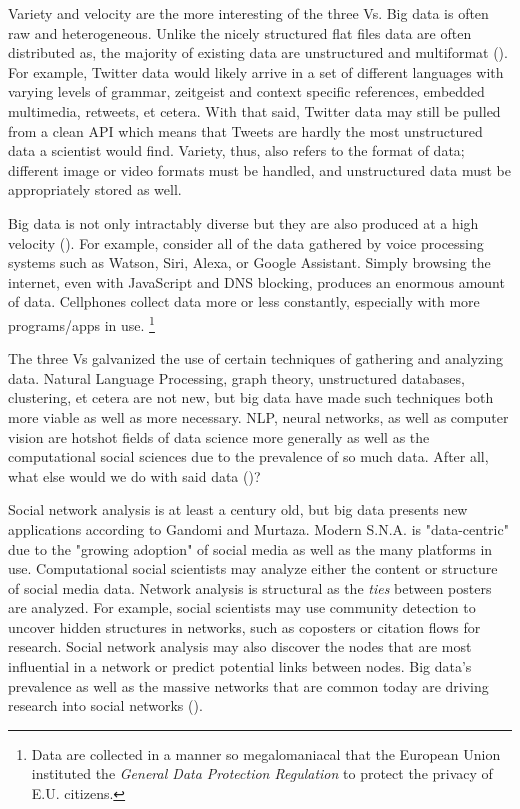 \documentclass[12pt, a4paper]{article}
\begin{document}
Variety and velocity are the more interesting of the three Vs. Big data is often raw and heterogeneous. Unlike the nicely structured flat files data are often distributed as, the majority of existing data are unstructured and multiformat (\cite{gandomiamir2015}). For example, Twitter data would likely arrive in a set of different languages with varying levels of grammar, zeitgeist and context specific references, embedded multimedia, retweets, et cetera. With that said, Twitter data may still be pulled from a clean API which means that Tweets are hardly the most unstructured data a scientist would find. Variety, thus, also refers to the format of data; different image or video formats must be handled, and unstructured data must be appropriately stored as well.

Big data is not only intractably diverse but they are also produced at a high velocity (\cite{gandomiamir2015}). For example, consider all of the data gathered by voice processing systems such as Watson, Siri, Alexa, or Google Assistant. Simply browsing the internet, even with JavaScript and DNS blocking, produces an enormous amount of data. Cellphones collect data more or less constantly, especially with more programs/apps in use. \footnote{Data are collected in a manner so megalomaniacal that the European Union instituted the \textit{General Data Protection Regulation} to protect the privacy of E.U. citizens.}

The three Vs galvanized the use of certain techniques of gathering and analyzing data. Natural Language Processing, graph theory, unstructured databases, clustering, et cetera are not new, but big data have made such techniques both more viable as well as more necessary. NLP, neural networks, as well as computer vision are hotshot fields of data science more generally as well as the computational social sciences due to the prevalence of so much data. After all, what else would we do with said data (\cite{gandomiamir2015})?

Social network analysis is at least a century old, but big data presents new applications according to Gandomi and Murtaza. Modern S.N.A. is "data-centric" due to the "growing adoption" of social media as well as the many platforms in use. Computational social scientists may analyze either the content or structure of social media data. Network analysis is structural as the \textit{ties} between posters are analyzed. For example, social scientists may use community detection to uncover hidden structures in networks, such as coposters or citation flows for research. Social network analysis may also discover the nodes that are most influential in a network or predict potential links between nodes. Big data's prevalence as well as the massive networks that are common today are driving research into social networks (\cite{gandomiamir2015}).
\end{document}
